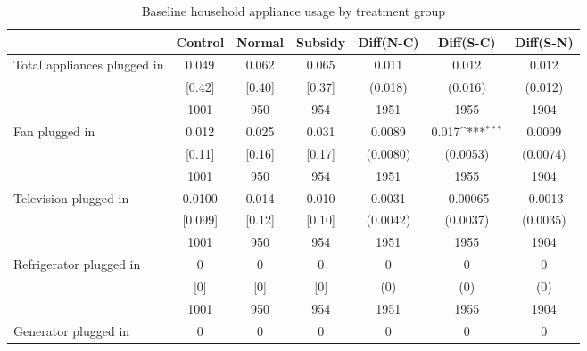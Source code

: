 \begin{table}[htbp]\centering
\def\sym#1{\ifmmode^{#1}\else\(^{#1}\)\fi}
\caption{Baseline household appliance usage by treatment group \label{tab:"balance"}}
\begin{tabular*}{1\hsize}{@{\hskip\tabcolsep\extracolsep\fill}l*{1}{cccccc}}
\toprule
                                &  Control&   Normal&  Subsidy&Diff(N-C)         &Diff(S-C)         &Diff(S-N)         \\
\midrule
Total appliances plugged in     &    0.049&    0.062&    0.065&    0.011         &    0.012         &    0.012         \\
                                &   [0.42]&   [0.40]&   [0.37]&  (0.018)         &  (0.016)         &  (0.012)         \\
                                &     1001&      950&      954&     1951         &     1955         &     1904         \\
Fan plugged in                  &    0.012&    0.025&    0.031&   0.0089         &    0.017\sym{***}&   0.0099         \\
                                &   [0.11]&   [0.16]&   [0.17]& (0.0080)         & (0.0053)         & (0.0074)         \\
                                &     1001&      950&      954&     1951         &     1955         &     1904         \\
Television plugged in           &   0.0100&    0.014&    0.010&   0.0031         & -0.00065         &  -0.0013         \\
                                &  [0.099]&   [0.12]&   [0.10]& (0.0042)         & (0.0037)         & (0.0035)         \\
                                &     1001&      950&      954&     1951         &     1955         &     1904         \\
Refrigerator plugged in         &        0&        0&        0&        0         &        0         &        0         \\
                                &      [0]&      [0]&      [0]&      (0)         &      (0)         &      (0)         \\
                                &     1001&      950&      954&     1951         &     1955         &     1904         \\
Generator plugged in            &        0&        0&        0&        0         &        0         &        0         \\

\end{tabular*}
\end{table}
